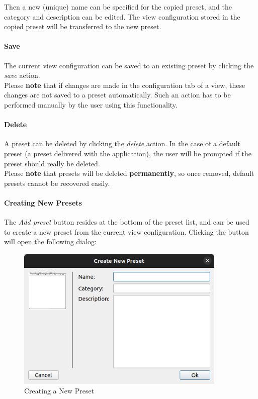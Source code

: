 Then a new (unique) name can be specified for the copied preset, and the category and description can be edited.
The view configuration stored in the copied preset will be transferred to the new preset.

\paragraph*{Save} The current view configuration can be saved to an existing preset by clicking the \textit{save} action. \\

Please \textbf{note} that if changes are made in the configuration tab of a view, these changes are not saved to a preset automatically. 
Such an action has to be performed manually by the user using this functionality.

\paragraph*{Delete} A preset can be deleted by clicking the \textit{delete} action.
In the case of a default preset (a preset delivered with the application), the user will be prompted if the preset should really
be deleted. \\

Please \textbf{note} that presets will be deleted \textbf{permanently}, so once removed, default presets cannot be recovered easily.

\paragraph*{Creating New Presets} The \textit{Add preset} button resides at the bottom of the preset list, 
and can be used to create a new preset from the current view configuration. Clicking the button will open the following dialog:

\begin{figure}[H]
    \center
    \includegraphics[width=10cm]{figures/view_preset_add.png}
  \caption{Creating a New Preset}
\end{figure}

